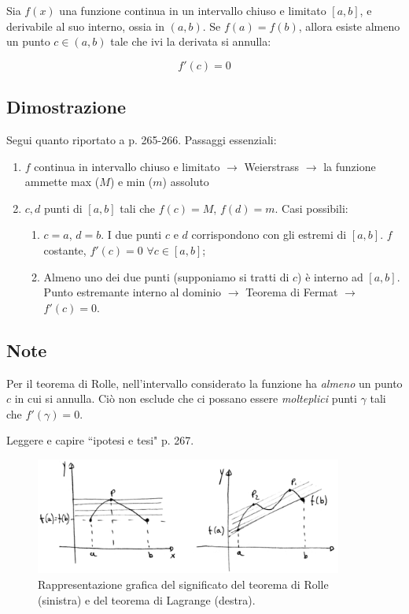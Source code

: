 \documentclass{article}
\begin{document}
Sia $f(x)$ una funzione continua in un intervallo chiuso e limitato $[a,b]$, e derivabile al suo interno, ossia in $(a,b)$. Se $f(a) = f(b)$, allora esiste almeno un punto $c\in(a,b)$ tale che ivi la derivata si annulla: 

\begin{equation}
    f'(c) = 0
\end{equation}

\subsection{Dimostrazione}

Segui quanto riportato a p. 265-266. Passaggi essenziali:
\begin{enumerate}
    \item $f$ continua in intervallo chiuso e limitato $\rightarrow$ Weierstrass $\rightarrow$ la funzione ammette max ($M$) e min ($m$) assoluto
    \item $c,d$ punti di $[a,b]$ tali che $f(c) = M$, $f(d) = m$. Casi possibili:
    \begin{enumerate}
        \item $c=a$, $d=b$. I due punti $c$ e $d$ corrispondono con gli estremi di $[a,b]$. $f$ costante, $f'(c) = 0$ $\forall c \in [a,b]$;
        \item Almeno uno dei due punti (supponiamo si tratti di $c$) è interno ad $[a,b]$. Punto estremante interno al dominio $\rightarrow$ Teorema di Fermat $\rightarrow$ $f'(c) = 0$.  
    \end{enumerate}
\end{enumerate}

\subsection{Note}

Per il teorema di Rolle, nell'intervallo considerato la funzione ha {\emph{almeno}} un punto $c$ in cui si annulla. Ciò non esclude che ci possano essere {\emph{molteplici}} punti $\gamma$ tali che $f'(\gamma) = 0$.

Leggere e capire ``ipotesi e tesi" p. 267.

\begin{figure}
    \centering
    \includegraphics[width=0.9\textwidth]{Rolle_Lagrange.jpg}
    \caption{Rappresentazione grafica del significato del teorema di Rolle (sinistra) e del teorema di Lagrange (destra).}
    \label{fig:my_label}
\end{figure}
\end{document}
